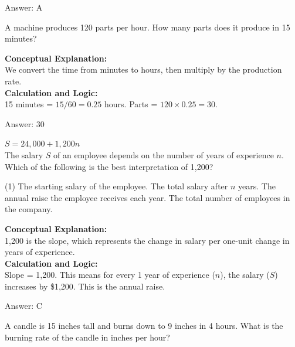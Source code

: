 \documentclass[11pt,paper=a4,answers]{exam}
\begin{document}
\begin{questions}
\begin{solution}
\vspace{15pt}
Answer: \colorbox{yellow!100}{A}
\end{solution}

\question
A machine produces 120 parts per hour. How many parts does it produce in 15 minutes?

\begin{solution}
\textbf{Conceptual Explanation:} \\
We convert the time from minutes to hours, then multiply by the production rate.
\\[10pt]
\textbf{Calculation and Logic:} \\
15 minutes = $15 / 60 = 0.25$ hours.
Parts = $120 \times 0.25 = 30$.

\vspace{15pt}
Answer: \colorbox{yellow!100}{30}
\end{solution}

\question
$S = 24,000 + 1,200n$ \\
The salary $S$ of an employee depends on the number of years of experience $n$. Which of the following is the best interpretation of 1,200?
\begin{tasks}(1)
    \task The starting salary of the employee.
    \task The total salary after $n$ years.
    \task The annual raise the employee receives each year.
    \task The total number of employees in the company.
\end{tasks}

\begin{solution}
\textbf{Conceptual Explanation:} \\
1,200 is the slope, which represents the change in salary per one-unit change in years of experience.
\\[10pt]
\textbf{Calculation and Logic:} \\
Slope = 1,200. This means for every 1 year of experience ($n$), the salary ($S$) increases by \$1,200. This is the annual raise.

\vspace{15pt}
Answer: \colorbox{yellow!100}{C}
\end{solution}

\question
A candle is 15 inches tall and burns down to 9 inches in 4 hours. What is the burning rate of the candle in inches per hour?


\end{questions}
\end{document}

